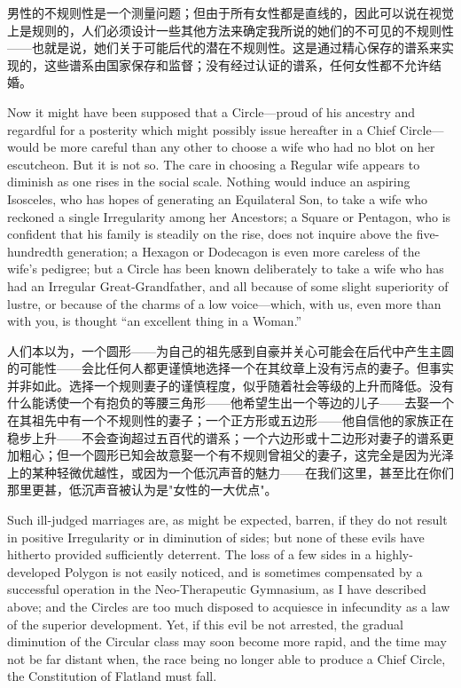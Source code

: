 \documentclass[12pt,UTF8]{ctexbook}
\begin{document}
男性的不规则性是一个测量问题；但由于所有女性都是直线的，因此可以说在视觉上是规则的，人们必须设计一些其他方法来确定我所说的她们的不可见的不规则性——也就是说，她们关于可能后代的潜在不规则性。这是通过精心保存的谱系来实现的，这些谱系由国家保存和监督；没有经过认证的谱系，任何女性都不允许结婚。

Now it might have been supposed that a Circle---proud of his ancestry and regardful for a posterity which might possibly issue hereafter in a Chief Circle---would be more careful than any other to choose a wife who had no blot on her escutcheon. But it is not so. The care in choosing a Regular wife appears to diminish as one rises in the social scale. Nothing would induce an aspiring Isosceles, who has hopes of generating an Equilateral Son, to take a wife who reckoned a single Irregularity among her Ancestors; a Square or Pentagon, who is confident that his family is steadily on the rise, does not inquire above the five-hundredth generation; a Hexagon or Dodecagon is even more careless of the wife's pedigree; but a Circle has been known deliberately to take a wife who has had an Irregular Great-Grandfather, and all because of some slight superiority of lustre, or because of the charms of a low voice---which, with us, even more than with you, is thought ``an excellent thing in a Woman.''

人们本以为，一个圆形——为自己的祖先感到自豪并关心可能会在后代中产生主圆的可能性——会比任何人都更谨慎地选择一个在其纹章上没有污点的妻子。但事实并非如此。选择一个规则妻子的谨慎程度，似乎随着社会等级的上升而降低。没有什么能诱使一个有抱负的等腰三角形——他希望生出一个等边的儿子——去娶一个在其祖先中有一个不规则性的妻子；一个正方形或五边形——他自信他的家族正在稳步上升——不会查询超过五百代的谱系；一个六边形或十二边形对妻子的谱系更加粗心；但一个圆形已知会故意娶一个有不规则曾祖父的妻子，这完全是因为光泽上的某种轻微优越性，或因为一个低沉声音的魅力——在我们这里，甚至比在你们那里更甚，低沉声音被认为是"女性的一大优点"。

Such ill-judged marriages are, as might be expected, barren, if they do not result in positive Irregularity or in diminution of sides; but none of these evils have hitherto provided sufficiently deterrent. The loss of a few sides in a highly-developed Polygon is not easily noticed, and is sometimes compensated by a successful operation in the Neo-Therapeutic Gymnasium, as I have described above; and the Circles are too much disposed to acquiesce in infecundity as a law of the superior development. Yet, if this evil be not arrested, the gradual diminution of the Circular class may soon become more rapid, and the time may not be far distant when, the race being no longer able to produce a Chief Circle, the Constitution of Flatland must fall.
\end{document}
